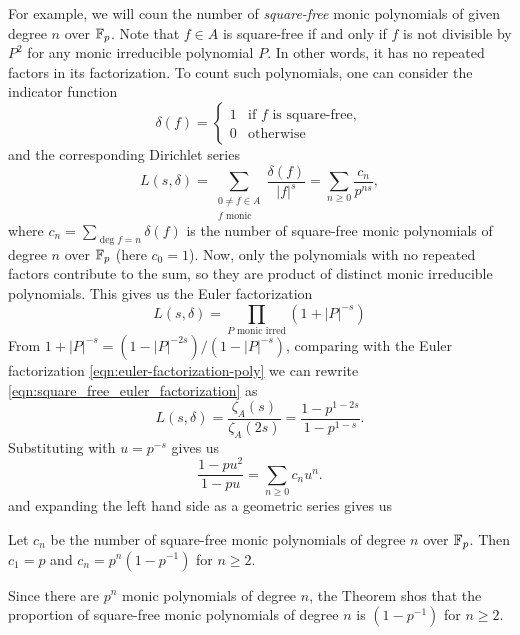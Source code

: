 For example, we will coun the number of \emph{square-free} monic polynomials of given degree $n$ over $\mathbb{F}_p$.
Note that $f \in A$ is square-free if and only if $f$ is not divisible by $P^2$ for any monic irreducible polynomial $P$.
In other words, it has no repeated factors in its factorization.
To count such polynomials, one can consider the indicator function
\begin{equation}
    \delta(f) = \begin{cases}
        1 & \text{if } f \text{ is square-free},\\
        0 & \text{otherwise}
    \end{cases}
    \label{eqn:square_free_indicator}
\end{equation}
and the corresponding Dirichlet series
\begin{equation}
    L(s, \delta) = \sum_{\substack{0 \ne f \in A \\ f \text{ monic}}} \frac{\delta(f)}{|f|^s} = \sum_{n \ge 0} \frac{c_n}{p^{ns}},
    \label{eqn:square_free_dirichlet_series}
\end{equation}
where $c_n = \sum_{\deg f = n} \delta(f)$ is the number of square-free monic polynomials of degree $n$ over $\mathbb{F}_p$ (here $c_0 = 1$).
Now, only the polynomials with no repeated factors contribute to the sum, so they are product of distinct monic irreducible polynomials.
This gives us the Euler factorization
\begin{equation}
    L(s, \delta) = \prod_{P \text{ monic irred}} (1 + |P|^{-s})
    \label{eqn:square_free_euler_factorization}
\end{equation}
From $1 + |P|^{-s} = (1 - |P|^{-2s}) / (1 - |P|^{-s})$, comparing with the Euler factorization \eqref{eqn:euler-factorization-poly} we can rewrite \eqref{eqn:square_free_euler_factorization} as
\begin{equation}
    L(s, \delta) = \frac{\zeta_A(s)}{\zeta_A(2s)} = \frac{1 - p^{1-2s}}{1 - p^{1 - s}}.
    \label{eqn:square_free_dirichlet_series_2}
\end{equation}
Substituting with $u = p^{-s}$ gives us
\[
    \frac{1 - pu^2}{1 - pu} = \sum_{n \ge 0} c_n u^{n}.
\]
and expanding the left hand side as a geometric series gives us

\begin{theorem}
    \label{thm:square-free-monic-poly}
    Let $c_n$ be the number of square-free monic polynomials of degree $n$ over $\mathbb{F}_p$.
    Then $c_1 = p$ and $c_n = p^n(1 - p^{-1})$ for $n \ge 2$.
\end{theorem}
Since there are $p^n$ monic polynomials of degree $n$, the Theorem shos that the proportion of square-free monic polynomials of degree $n$ is $(1 - p^{-1})$ for $n \ge 2$.

